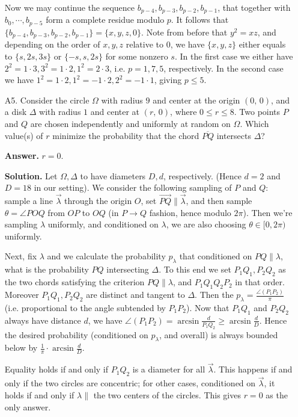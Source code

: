 \documentclass[11pt,a4paper]{article}
\begin{document}
\begin{enumerate}
			Now we may continue the sequence $b_{p - 4}, b_{p - 3}, b_{p - 2}, b_{p - 1}$, 
			that together with $b_0, \cdots, b_{p - 5}$ form a complete residue modulo $p$. 
			It follows that $\{b_{p - 4}, b_{p - 3}, b_{p - 2}, b_{p - 1}\} = \{x, y, z, 0\}$. 
			Note from before that $y^2=xz$, and depending on the order of $x, y, z$ relative to 0, 
			we have $\{x, y, z\}$ either equals to $\{s, 2s, 3s\}$ or $\{-s, s, 2s\}$ for some nonzero $s$. 
			In the first case we either have $2^2=1\cdot 3, 3^2=1\cdot 2, 1^2=2\cdot 3$, 
			i.e. $p=1, 7, 5$, respectively. 
			In the second case we have $1^2=1\cdot 2, 1^2=-1\cdot 2, 2^2=-1\cdot 1$, giving $p\le 5$. 
			
		\item [A5.]
		Consider the circle $\Omega$ with radius $9$ and center at the origin $(0,\,0)$, and a disk $\Delta$ with radius $1$ and center at $(r,\,0)$, where $0\leq r\leq 8$. Two points $P$ and $Q$ are chosen independently and uniformly at random on $\Omega$. Which value(s) of $r$ minimize the probability that the chord $\overline{PQ}$ intersects $\Delta$?
		
		\textbf{Answer.} $r = 0$. 
		
		\textbf{Solution.} 
		Let $\Omega, \Delta$ to have diameters $D, d$, respectively. 
		(Hence $d = 2$ and $D = 18$ in our setting). 
		We consider the following sampling of $P$ and $Q$: 
		sample a line $\vec{\lambda}$ through the origin $O$, 
		set $\vec{PQ}\parallel \vec{\lambda}$, 
		and then sample $\theta = \angle POQ$ from $OP$ to $OQ$ (in $P\to Q$ fashion, 
		hence modulo $2\pi$). 
		Then we're sampling $\lambda$ uniformly, 
		and conditioned on $\lambda$, we are also choosing $\theta \in [0, 2\pi)$ uniformly. 
		
		Next, fix $\lambda$ and we calculate the probability $p_{\lambda}$ that conditioned on $PQ\parallel \lambda$, 
		what is the probability $PQ$ intersecting $\Delta$. 
		To this end we set $P_1Q_1, P_2Q_2$ as the two chords satisfying the criterion $PQ\parallel \lambda$, 
		and $P_1Q_1Q_2P_2$ in that order. 
		Moreover $P_1Q_1, P_2Q_2$ are distinct and tangent to $\Delta$. 
		Then the $p_{\lambda} = \frac{\angle (P_1P_2)}{\pi}$ (i.e. proportional to the angle subtended by $P_1P_2$). 
		Now that $P_1Q_1$ and $P_2Q_2$ always have distance $d$, 
		we have $\angle (P_1P_2) = \arcsin\frac{d}{P_1Q_2}\ge \arcsin\frac{d}{D}$. 
		Hence the desired probability (conditioned on $p_{\lambda}$, and overall) is always bounded below by 
		$\frac{1}{\pi}\cdot \arcsin\frac{d}{D}$. 
		
		Equality holds if and only if $P_1Q_2$ is a diameter for all $\vec{\lambda}$. 
		This happens if and only if the two circles are concentric; for other cases, conditioned on $\vec{\lambda}$, 
		it holds if and only if $\lambda\parallel $ the two centers of the circles. 
		This gives $r = 0$ as the only answer. 
	\end{enumerate}
\end{document}
